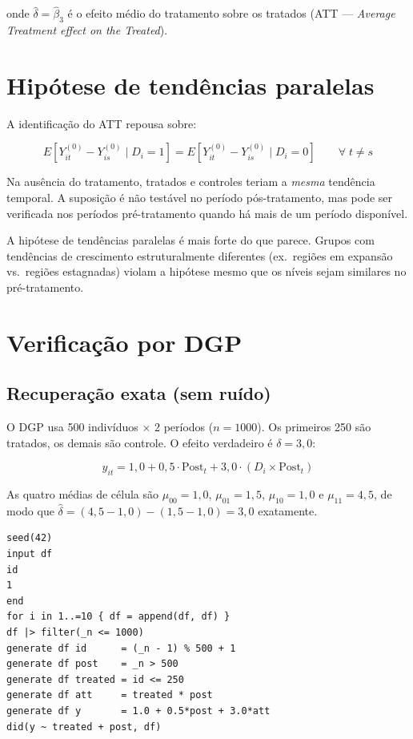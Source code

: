 onde $\hat\delta = \hat\beta_3$ é o efeito médio do tratamento sobre os
tratados (ATT — \emph{Average Treatment effect on the Treated}).

\section{Hipótese de tendências paralelas}

A identificação do ATT repousa sobre:

\[
  E\!\left[Y_{it}^{(0)} - Y_{is}^{(0)} \mid D_i = 1\right]
  = E\!\left[Y_{it}^{(0)} - Y_{is}^{(0)} \mid D_i = 0\right]
  \qquad \forall\; t \neq s
\]

Na ausência do tratamento, tratados e controles teriam a \emph{mesma}
tendência temporal. A suposição é não testável no período pós-tratamento,
mas pode ser verificada nos períodos pré-tratamento quando há mais de um
período disponível.

\begin{aviso}
  A hipótese de tendências paralelas é mais forte do que parece. Grupos
  com tendências de crescimento estruturalmente diferentes (ex.\ regiões
  em expansão vs.\ regiões estagnadas) violam a hipótese mesmo que os
  níveis sejam similares no pré-tratamento.
\end{aviso}

\section{Verificação por DGP}

\subsection*{Recuperação exata (sem ruído)}

O DGP usa 500 indivíduos × 2 períodos ($n = 1000$). Os primeiros 250
são tratados, os demais são controle. O efeito verdadeiro é $\delta = 3{,}0$:

\[
  y_{it} = 1{,}0 + 0{,}5\cdot\text{Post}_t + 3{,}0\cdot(D_i\times\text{Post}_t)
\]

As quatro médias de célula são $\mu_{00}=1{,}0$, $\mu_{01}=1{,}5$,
$\mu_{10}=1{,}0$ e $\mu_{11}=4{,}5$, de modo que
$\hat\delta = (4{,}5 - 1{,}0) - (1{,}5 - 1{,}0) = 3{,}0$ exatamente.

\begin{lstlisting}[caption={DGP DiD sem ruído — recuperação exata}]
seed(42)
input df
id
1
end
for i in 1..=10 { df = append(df, df) }
df |> filter(_n <= 1000)
generate df id      = (_n - 1) % 500 + 1
generate df post    = _n > 500
generate df treated = id <= 250
generate df att     = treated * post
generate df y       = 1.0 + 0.5*post + 3.0*att
did(y ~ treated + post, df)
\end{lstlisting}

